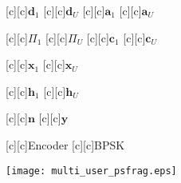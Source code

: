 \documentclass{article}
\begin{document}
\begin{figure}[htb]
  \begin{center}


        [c][c]{$\mathrm{\mathbf{d}}_1$}
        [c][c]{$\mathrm{\mathbf{d}}_U$}
        [c][c]{$\mathrm{\mathbf{a}}_1$}
        [c][c]{$\mathrm{\mathbf{a}}_U$}

        [c][c]{$\Pi_1$}
        [c][c]{$\Pi_U$}
        [c][c]{$\mathrm{\mathbf{c}}_1$}
        [c][c]{$\mathrm{\mathbf{c}}_U$}

        [c][c]{$\mathrm{\mathbf{x}}_1$}
        [c][c]{$\mathrm{\mathbf{x}}_U$}
	
	[c]{$\mathrm{\mathbf{h}}_1$}
        [c][c]{$\mathrm{\mathbf{h}}_U$}


        [c][c]{$\mathrm{\mathbf{n}}$}
        [c][c]{$\mathrm{\mathbf{y}}$}

        [c][c]{Encoder}
        [c][c]{BPSK}


    \texttt{[image: multi\_user\_psfrag.eps]}
    \end{center}
\end{figure}
\end{document}
